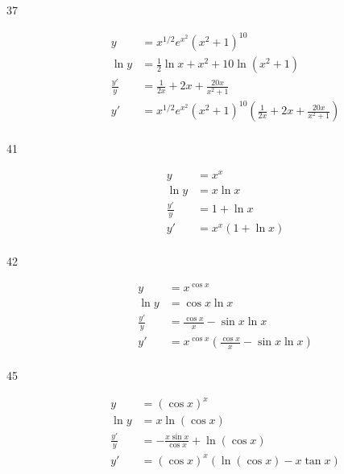 \documentclass[letterpaper, landscape]{exam}
\begin{document}
\begin{description}
    \item[37] 
      \begin{align*}
        y            & = x^{1/2} e^{x^2} \left( x^2 + 1 \right)^{10} \\
        \ln y        & = \frac{1}{2} \ln x + x^2 + 10 \ln \left( x^2 + 1 \right) \\
        \frac{y'}{y} & = \frac{1}{2x} + 2x + \frac{20x}{x^2 + 1} \\
        y'           & = \boxed{ x^{1/2} e^{x^2} \left( x^2 + 1 \right)^{10} \left( \frac{1}{2x} + 2x + \frac{20x}{x^2 + 1} \right) } \\
      \end{align*}

    \item[41] 
      \begin{align*}
        y            & = x^x \\
        \ln y        & = x \ln x \\
        \frac{y'}{y} & = 1 + \ln x \\
        y'           & = \boxed{ x^x (1 + \ln x) } \\
      \end{align*}

    \item[42] 
      \begin{align*}
        y            & = x^{\cos x} \\
        \ln y        & = \cos x \ln x \\
        \frac{y'}{y} & = \frac{\cos x}{x} - \sin x \ln x \\
        y'           & = \boxed{ x^{\cos x} \left( \frac{\cos x}{x} - \sin x \ln x \right) } \\
      \end{align*}

    \item[45] 
      \begin{align*}
        y            & = (\cos x)^x \\
        \ln y        & = x \ln (\cos x) \\
        \frac{y'}{y} & = - \frac{x \sin x}{\cos x} + \ln (\cos x) \\
        y'           & = \boxed{ (\cos x)^x (\ln (\cos x) - x \tan x) } \\
      \end{align*}


\end{description}
\end{document}
